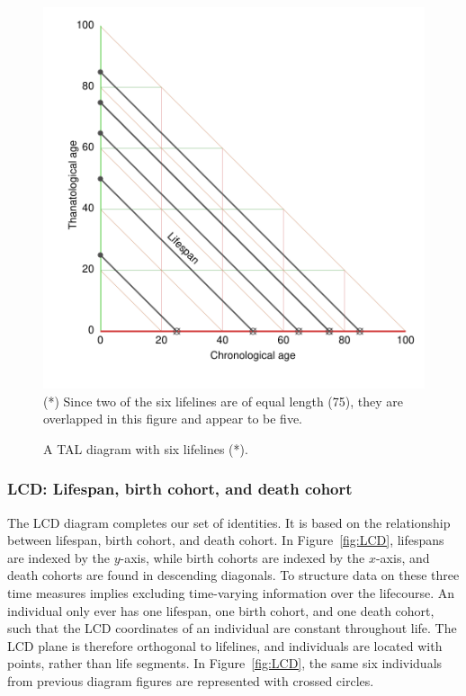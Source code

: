\documentclass[12pt,oneside,a4paper]{article} %
\newcommand\tgh[1]{\raisebox{-.25\height}{\texttt{[image: Figures/triadtable/triad\#1.pdf]}}}
\begin{document}
\begin{figure}[h!] 
\caption{A TAL diagram with six lifelines (*).}
\label{fig:TAL}
\centering
\includegraphics[scale=0.55]{Figures/TALrt.pdf}
\bigskip
(*) Since two of the six lifelines are of equal length (75), they are
overlapped in this figure and appear to be five.
\end{figure} 


\FloatBarrier
\subsubsection{LCD: Lifespan, birth cohort, and death cohort}%
\FloatBarrier

The LCD diagram completes our set of identities. It is based on the relationship
between lifespan, birth cohort, and death cohort. In
Figure~\ref{fig:LCD}, lifespans are indexed by the $y$-axis, while birth cohorts are indexed by the $x$-axis, and death cohorts
are found in descending diagonals. To structure data on these three
time measures implies excluding time-varying information over the lifecourse.
An individual
only ever has one lifespan, one birth cohort, and one death cohort, such that
the LCD coordinates of an individual are constant throughout life.
The LCD plane is therefore orthogonal to lifelines, and individuals are located
with points, rather than life segments.
In Figure~\ref{fig:LCD}, the same six individuals from previous diagram figures are represented with crossed circles.
\end{document}
